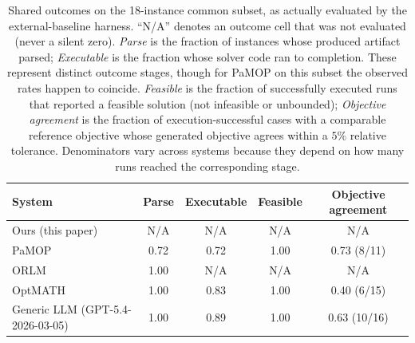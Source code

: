 \documentclass[pdflatex,sn-basic,Numbered]{sn-jnl}
\begin{document}
\begin{table}[t]
  \centering
  \caption{Shared outcomes on the 18-instance common subset, as actually evaluated by the external-baseline harness. ``N/A'' denotes an outcome cell that was not evaluated (never a silent zero). \textit{Parse} is the fraction of instances whose produced artifact parsed; \textit{Executable} is the fraction whose solver code ran to completion. These represent distinct outcome stages, though for PaMOP on this subset the observed rates happen to coincide. \textit{Feasible} is the fraction of successfully executed runs that reported a feasible solution (not infeasible or unbounded); \textit{Objective agreement} is the fraction of execution-successful cases with a comparable reference objective whose generated objective agrees within a $5\%$ relative tolerance. Denominators vary across systems because they depend on how many runs reached the corresponding stage.}
  \label{tab:ext-outcomes}
  \small
  \setlength{\tabcolsep}{4pt}
  \begin{tabular}{lcccc}
    \toprule
    System & Parse & Executable & Feasible & Objective agreement \\
    \midrule
    Ours (this paper) & N/A & N/A & N/A & N/A \\
    PaMOP \cite{pan2025pamop} & 0.72 & 0.72 & 1.00 & 0.73 (8/11) \\
    ORLM \cite{huang2025orlm} & 1.00 & N/A & N/A & N/A \\
    OptMATH \cite{lu2025optmath} & 1.00 & 0.83 & 1.00 & 0.40 (6/15) \\
    Generic LLM (GPT-5.4-2026-03-05) & 1.00 & 0.89 & 1.00 & 0.63 (10/16) \\
    \bottomrule
  \end{tabular}
\end{table}
\end{document}
